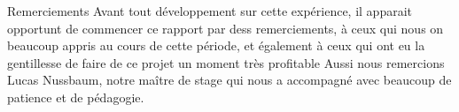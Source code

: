 \newline
\newline
\newline
\newline
\newline
\newline
\newline
\newline
\newline
\newline
\newline
\newline
\newline
\newline
\newline
Remerciements
\newline
\newline
Avant tout développement sur cette expérience, il apparait opportunt de commencer ce rapport par dess remerciements, à ceux qui nous on beaucoup appris au cours de cette période, et également à ceux qui ont eu la gentillesse de faire de ce projet un moment très profitable
\newline
\newline
Aussi nous remercions Lucas Nussbaum, notre maître de stage qui nous a accompagné avec beaucoup de patience et de pédagogie. 
